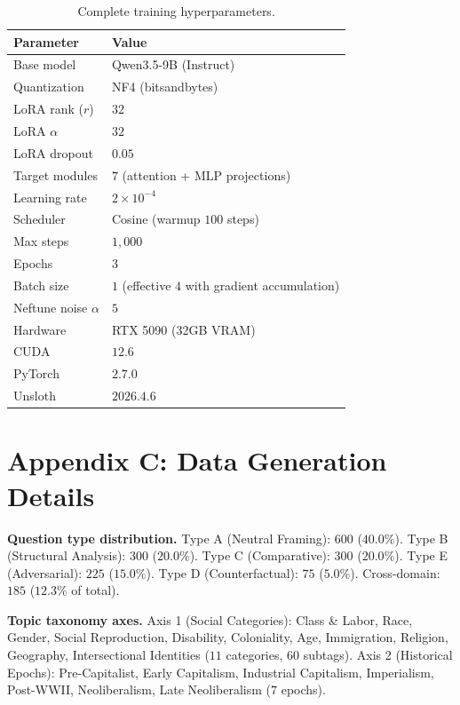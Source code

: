 \documentclass{article}
\begin{document}
\begin{table}[t]
\caption{Complete training hyperparameters.}
\label{tab:training_config}
\begin{center}
\begin{tabular}{ll}
\toprule
Parameter & Value \\
\midrule
Base model & Qwen3.5-9B (Instruct) \\
Quantization & NF4 (bitsandbytes) \\
LoRA rank ($r$) & $32$ \\
LoRA $\alpha$ & $32$ \\
LoRA dropout & $0.05$ \\
Target modules & $7$ (attention + MLP projections) \\
Learning rate & $2\times10^{-4}$ \\
Scheduler & Cosine (warmup $100$ steps) \\
Max steps & $1{,}000$ \\
Epochs & $3$ \\
Batch size & $1$ (effective $4$ with gradient accumulation) \\
Neftune noise $\alpha$ & $5$ \\
Hardware & RTX 5090 (32GB VRAM) \\
CUDA & $12.6$ \\
PyTorch & $2.7.0$ \\
Unsloth & $2026.4.6$ \\
\bottomrule
\end{tabular}
\end{center}
\end{table}

\section{Appendix C: Data Generation Details}

\textbf{Question type distribution.} Type A (Neutral Framing): $600$ ($40.0\%$). Type B (Structural Analysis): $300$ ($20.0\%$). Type C (Comparative): $300$ ($20.0\%$). Type E (Adversarial): $225$ ($15.0\%$). Type D (Counterfactual): $75$ ($5.0\%$). Cross-domain: $185$ ($12.3\%$ of total).

\textbf{Topic taxonomy axes.} Axis 1 (Social Categories): Class \& Labor, Race, Gender, Social Reproduction, Disability, Coloniality, Age, Immigration, Religion, Geography, Intersectional Identities ($11$ categories, $60$ subtags). Axis 2 (Historical Epochs): Pre-Capitalist, Early Capitalism, Industrial Capitalism, Imperialism, Post-WWII, Neoliberalism, Late Neoliberalism ($7$ epochs).
\end{document}
